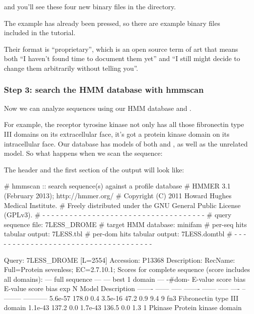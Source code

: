 and you'll see these four new binary files in the directory. 

The  example has already been pressed, so there
are example binary files\\
included in the tutorial.

Their format is ``proprietary'', which is an open source term of art
that means both ``I haven't found time to document them yet'' and ``I
still might decide to change them arbitrarily without telling you''.


\subsubsection{Step 3: search the HMM database with hmmscan}

Now we can analyze sequences using our HMM database and
. 

For example, the receptor tyrosine kinase  not only
has all those fibronectin type III domains on its extracellular face,
it's got a protein kinase domain on its intracellular face. Our
 database has models of both  and
, as well as the unrelated  model. So
what happens when we scan the  sequence:


The header and the first section of the output will look like:

\begin{samepage}
\begin{sreoutput}
# hmmscan :: search sequence(s) against a profile database
# HMMER 3.1 (February 2013); http://hmmer.org/
# Copyright (C) 2011 Howard Hughes Medical Institute.
# Freely distributed under the GNU General Public License (GPLv3).
# - - - - - - - - - - - - - - - - - - - - - - - - - - - - - - - - - - - -
# query sequence file:             7LESS_DROME
# target HMM database:             minifam
# per-seq hits tabular output:     7LESS.tbl
# per-dom hits tabular output:     7LESS.domtbl
# - - - - - - - - - - - - - - - - - - - - - - - - - - - - - - - - - - - -

Query:       7LESS_DROME  [L=2554]
Accession:   P13368
Description: RecName: Full=Protein sevenless;          EC=2.7.10.1;
Scores for complete sequence (score includes all domains):
   --- full sequence ---   --- best 1 domain ---    -#dom-
    E-value  score  bias    E-value  score  bias    exp  N  Model    Description
    ------- ------ -----    ------- ------ -----   ---- --  -------- -----------
    5.6e-57  178.0   0.4    3.5e-16   47.2   0.9    9.4  9  fn3       Fibronectin type III domain
    1.1e-43  137.2   0.0    1.7e-43  136.5   0.0    1.3  1  Pkinase   Protein kinase domain
\end{sreoutput}
\end{samepage}

